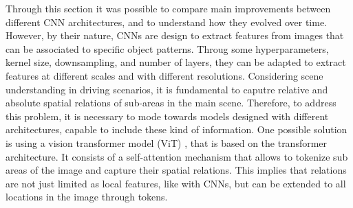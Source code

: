 Through this section it was possible to compare main improvements between 
different CNN architectures, and to understand how they evolved over time.
However, by their nature, CNNs are design to extract features from images that 
can be associated to specific object patterns. Throug some hyperparameters, 
kernel size, downsampling, and number of layers, they can be adapted to extract 
features at different scales and with different resolutions. Considering scene 
understanding in driving scenarios, it is fundamental to caputre relative and 
absolute spatial relations of sub-areas in the main scene. 
Therefore, to address this problem, it is necessary to mode towards models 
designed with different architectures, capable to include these kind of 
information. One possible solution is using a vision transformer model (ViT)
\cite{vit}, that is based on the transformer architecture. It consists of a 
self-attention mechanism that allows to tokenize sub areas of the image and 
capture their spatial relations. This implies that relations are not just 
limited as local features, like with CNNs, but can be extended to all locations 
in the image through tokens.

